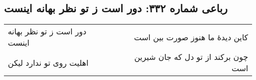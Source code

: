 \begin{center}
\section*{رباعی شماره ۳۳۲: دور است ز تو نظر بهانه اینست}
\label{sec:0332}
\begin{longtable}{l p{0.5cm} r}
دور است ز تو نظر بهانه اینست
&&
کاین دیدهٔ ما هنوز صورت بین است
\\
اهلیت روی تو ندارد لیکن
&&
چون برکند از تو دل که جان شیرین است
\\
\end{longtable}
\end{center}
